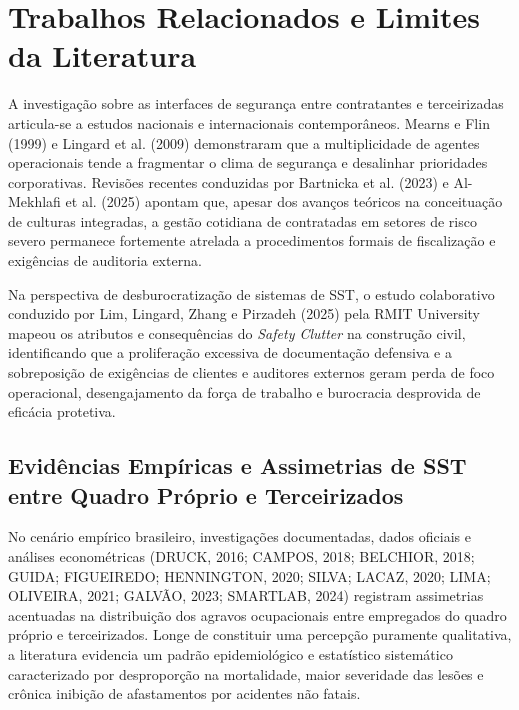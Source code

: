 \documentclass[12pt,a4paper]{article}
\begin{document}
\section{Trabalhos Relacionados e Limites da Literatura}

A investigação sobre as interfaces de segurança entre contratantes e terceirizadas articula-se a estudos nacionais e internacionais contemporâneos. Mearns e Flin (1999) e Lingard et al. (2009) demonstraram que a multiplicidade de agentes operacionais tende a fragmentar o clima de segurança e desalinhar prioridades corporativas. Revisões recentes conduzidas por Bartnicka et al. (2023) e Al-Mekhlafi et al. (2025) apontam que, apesar dos avanços teóricos na conceituação de culturas integradas, a gestão cotidiana de contratadas em setores de risco severo permanece fortemente atrelada a procedimentos formais de fiscalização e exigências de auditoria externa.

Na perspectiva de desburocratização de sistemas de SST, o estudo colaborativo conduzido por Lim, Lingard, Zhang e Pirzadeh (2025) pela RMIT University mapeou os atributos e consequências do \textit{Safety Clutter} na construção civil, identificando que a proliferação excessiva de documentação defensiva e a sobreposição de exigências de clientes e auditores externos geram perda de foco operacional, desengajamento da força de trabalho e burocracia desprovida de eficácia protetiva.

\subsection{Evidências Empíricas e Assimetrias de SST entre Quadro Próprio e Terceirizados}

No cenário empírico brasileiro, investigações documentadas, dados oficiais e análises econométricas (DRUCK, 2016; CAMPOS, 2018; BELCHIOR, 2018; GUIDA; FIGUEIREDO; HENNINGTON, 2020; SILVA; LACAZ, 2020; LIMA; OLIVEIRA, 2021; GALVÃO, 2023; SMARTLAB, 2024) registram assimetrias acentuadas na distribuição dos agravos ocupacionais entre empregados do quadro próprio e terceirizados. Longe de constituir uma percepção puramente qualitativa, a literatura evidencia um padrão epidemiológico e estatístico sistemático caracterizado por desproporção na mortalidade, maior severidade das lesões e crônica inibição de afastamentos por acidentes não fatais.
\end{document}
